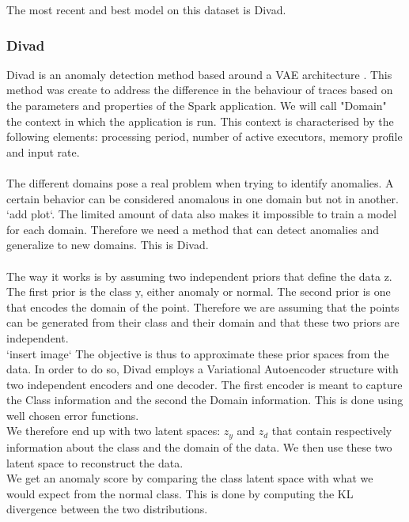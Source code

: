 \documentclass[oneside, a4paper, onecolumn, 11pt]{article}
\begin{document}
The most recent and best model on this dataset is Divad.
\subsubsection{Divad}
Divad is an anomaly detection method based around a VAE architecture \cite{Divad}. This method was create to address the difference in the behaviour of traces based on the parameters and properties of the Spark application. We will call "Domain" the context in which the application is run. This context is characterised by the following elements: processing period, number of active executors, memory profile and input rate.\\\\
The different domains pose a real problem when trying to identify anomalies. A certain behavior can be considered anomalous in one domain but not in another. `add plot`.
The limited amount of data also makes it impossible to train a model for each domain. Therefore we need a method that can detect anomalies and generalize to new domains. This is Divad.\\\\
The way it works is by assuming two independent priors that define the data z. The first prior is the class y, either anomaly or normal. The second prior is one that encodes the domain of the point. Therefore we are assuming that the points can be generated from their class and their domain and that these two priors are independent.\\
`insert image`
The objective is thus to approximate these prior spaces from the data. In order to do so, Divad employs a Variational Autoencoder structure with two independent encoders and one decoder. The first encoder is meant to capture the Class information and the second the Domain information. This is done using well chosen error functions.\\
We therefore end up with two latent spaces: $z_y$ and $z_d$ that contain respectively information about the class and the domain of the data. We then use these two latent space to reconstruct the data.\\
We get an anomaly score by comparing the class latent space with what we would expect from the normal class. This is done by computing the KL divergence between the two distributions.\\
\end{document}
